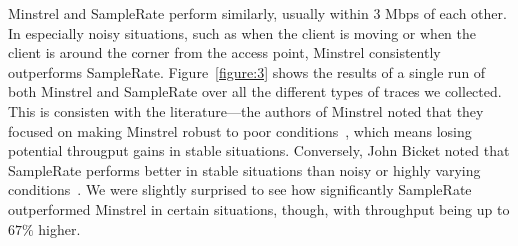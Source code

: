 \documentclass[twocolumn,10pt]{article}
\begin{document}
Minstrel and SampleRate perform similarly, usually within 3 Mbps of
each other.  In especially noisy situations, such as when the client
is moving or when the client is around the corner from the access
point, Minstrel consistently outperforms SampleRate.
Figure~\ref{figure:3} shows the results of a single run of both
Minstrel and SampleRate over all the different types of traces we
collected.  This is consisten with the literature---the authors of
Minstrel noted that they focused on making Minstrel robust to poor
conditions~\cite{minstrel}, which means losing potential througput
gains in stable situations.  Conversely, John Bicket noted that
SampleRate performs better in stable situations than noisy or highly
varying conditions~\cite{samplerate}.  We were slightly surprised to
see how significantly SampleRate outperformed Minstrel in certain
situations, though, with throughput being up to $67\%$ higher.
\end{document}

